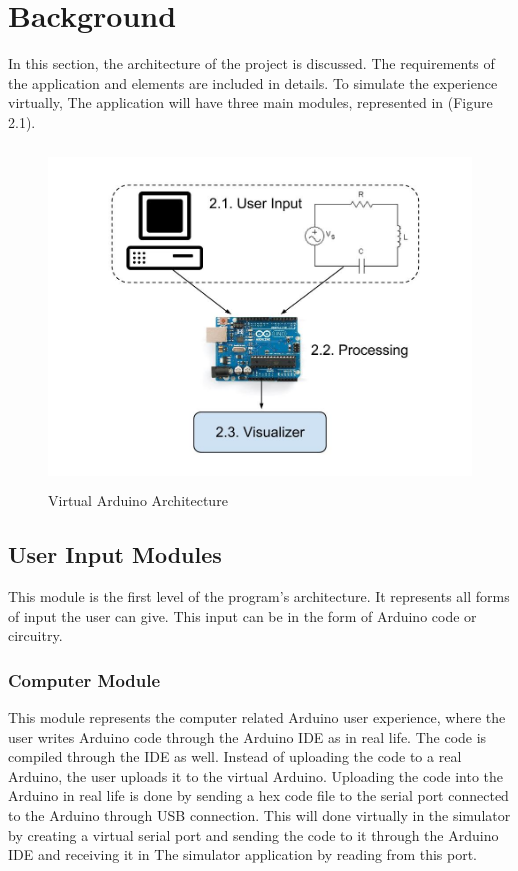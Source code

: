 \documentclass[12pt, a4paper]{report}
\begin{document}
\chapter{Background}
In this section, the architecture of the project is discussed. The requirements of the application and elements are included in details. To simulate the experience virtually, The application will have three main modules, represented in (Figure 2.1).

\begin{figure}[h!]
\centering
\includegraphics[height=9cm, width=12cm]{Architecture.jpg}
\caption{Virtual Arduino Architecture}
\label{Architecture}
\end{figure}

\section{User Input Modules}
This module is the first level of the program’s architecture. It represents all forms of input the user can give. This input can be in the form of Arduino code or circuitry.
\subsection{Computer Module}
This module represents the computer related Arduino user experience, where the user writes Arduino code through the Arduino IDE as in real life. The code is compiled through the IDE as well. Instead of uploading the code to a real Arduino, the user uploads it to the virtual Arduino. Uploading the code into the Arduino in real life is done by sending a hex code file to the serial port connected to the Arduino through USB connection. This will done virtually in the simulator by creating a virtual serial port and sending the code to it through the Arduino IDE and receiving it in The simulator application by reading from this port.
\newpage
\end{document}
